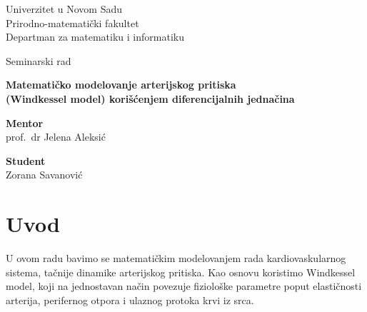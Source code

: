 \documentclass[12pt,a4paper]{article}
\begin{document}
\begin{titlepage}
    \centering
    
    \vspace*{1cm}
    
    {\large Univerzitet u Novom Sadu}\\[0.3cm]
    {\large Prirodno-matematički fakultet}\\[0.2cm]
    {\large Departman za matematiku i informatiku}
    
    \vspace{3cm}
    
    {\Large Seminarski rad}
    
    \vspace{1cm}
    
    {\LARGE \bfseries Matematičko modelovanje arterijskog pritiska\\[0.3cm]
    (Windkessel model) korišćenjem diferencijalnih jednačina}
    
    \vfill
    
    \begin{minipage}[t]{0.45\textwidth}
        \raggedright
        \textbf{Mentor}\\
        prof.\ dr Jelena Aleksić
    \end{minipage}
    \hfill
    \begin{minipage}[t]{0.45\textwidth}
        \raggedleft
        \textbf{Student}\\
        Zorana Savanović
    \end{minipage}
    
    \vspace{2cm}
    
\end{titlepage}

\tableofcontents
\newpage

\section{Uvod}

U ovom radu bavimo se matematičkim modelovanjem rada kardiovaskularnog sistema, tačnije dinamike arterijskog pritiska. Kao osnovu koristimo Windkessel model, koji na jednostavan način povezuje fiziološke parametre poput elastičnosti arterija, perifernog otpora i ulaznog protoka krvi iz srca.
\end{document}
